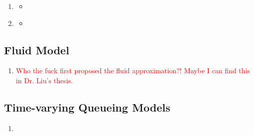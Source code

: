 \begin{enumerate}
\item \citet{koccauga2010admission}
\begin{itemize}
    \item 
\end{itemize}

\item \citet{ward2008asymptotically}
\begin{itemize}
    \item 
\end{itemize}

\end{enumerate}

\subsection{Fluid Model}
\begin{enumerate}
\item \textcolor{red}{Who the fuck first proposed the fluid approximation?! Maybe I can find this in Dr. Liu's thesis.}
\end{enumerate}
\subsection{Time-varying Queueing Models}
\begin{enumerate}
\item 
\end{enumerate}
